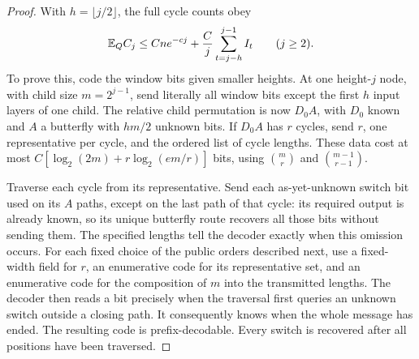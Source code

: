 \begin{proof}
With $h=\lfloor j/2\rfloor$, the full cycle counts obey
\begin{equation}\label{rec:cycle-window-entropy}
 \mathbb E_Q C_j\le Cne^{-cj}+\frac{C}{j}
                         \sum_{t=j-h}^{j-1}I_t\qquad(j\ge2).
\end{equation}
To prove this, code the window bits given smaller heights.  At one
height-$j$ node, with child size $m=2^{j-1}$, send literally all window
bits except the first $h$ input layers of one child.  The relative child
permutation is now $D_0A$, with $D_0$ known and $A$ a butterfly with
$hm/2$ unknown bits.  If $D_0A$ has $r$ cycles, send $r$, one
representative per cycle, and the ordered list of cycle lengths.  These
data cost at most
$C[\log_2(2m)+r\log_2(em/r)]$ bits, using
${m\choose r}$ and ${m-1\choose r-1}$.

Traverse each cycle from its representative.  Send each as-yet-unknown
switch bit used on its $A$ paths, except on the last path of that cycle:
its required output is already known, so its unique butterfly route
recovers all those bits without sending them.  The specified lengths tell the decoder exactly when this omission occurs.
For each fixed choice of the public orders described next, use a fixed-width
field for $r$, an enumerative code for its representative set, and an
enumerative code for the composition of $m$ into the transmitted lengths.
The decoder then reads a bit precisely when the traversal first queries
an unknown switch outside a closing path.  It consequently knows when the
whole message has ended.  The resulting code is prefix-decodable.  Every
switch is recovered after all positions have been traversed.


\end{proof}

